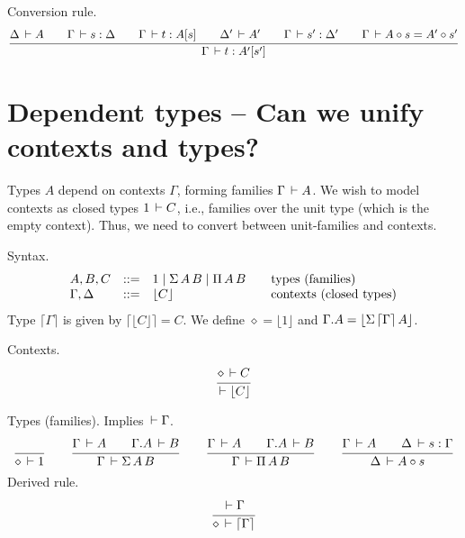 \documentclass{article}
\newcommand{\ty}[1]{\lceil #1 \rceil}
\renewcommand{\cxt}[1]{\lfloor #1 \rfloor}
\newcommand{\SigT}[2]{\Sigma\,#1\,#2}
\renewcommand{\PiT}[2]{\Pi\,#1\,#2}
\renewcommand{\cempty}{\diamond}
\begin{document}
Conversion rule.
\begin{gather*}
  \ru{\Delta \der A \qquad
      \Gamma \der s : \Delta \qquad
      \Gamma \der t : A [s] \qquad
      \Delta' \der A' \qquad
      \Gamma \der s' : \Delta' \qquad
      \Gamma \der A \comp s = A' \comp s'
    }{\Gamma \der t : A' [s']}
\end{gather*}


\section{Dependent types -- Can we unify contexts and types?}

Types $A$ depend on contexts $\Gamma$, forming families $\Gamma \,\vdash A$.
We wish to model contexts as closed types $1 \,\vdash C$, i.e., families
over the unit type (which is the empty context).  Thus, we need to
convert between unit-families and contexts.

Syntax.
\[
\begin{array}{lrl@{\qquad}l}
  A,B,C & ::= & 1 \mid \SigT A B \mid \PiT A B %
    & \mbox{types (families)} \\
  \Gamma, \Delta & ::= & \cxt{C}
    & \mbox{contexts (closed types)} \\
\end{array}
\]
Type $\ty{\Gamma}$ is given by $\ty{\cxt C} = C$.
We define $\cempty = \cxt 1$ and
$\cext \Gamma A = \cxt{\SigT{\ty \Gamma} A}$.

Contexts. \fbox{$\der \Gamma$}
\begin{gather*}
  \ru{\cempty \der C}{\der \cxt C}
\end{gather*}

Types (families).   Implies $\der \Gamma$.
\begin{gather*}
  \ru{
    }{\cempty \der 1}
\qquad
  \ru{\Gamma \der A \qquad
      \cext \Gamma A \der B
    }{\Gamma \der \SigT A B}
\qquad
  \ru{\Gamma \der A \qquad
      \cext \Gamma A \der B
    }{\Gamma \der \PiT A B}
\qquad
  \ru{\Gamma \der A \qquad \Delta \der s : \Gamma
    }{\Delta \der A \comp s}
\end{gather*}
Derived rule.
\begin{gather*}
  \ru{\der \Gamma
    }{\cempty \der \ty\Gamma}
\end{gather*}
\end{document}
